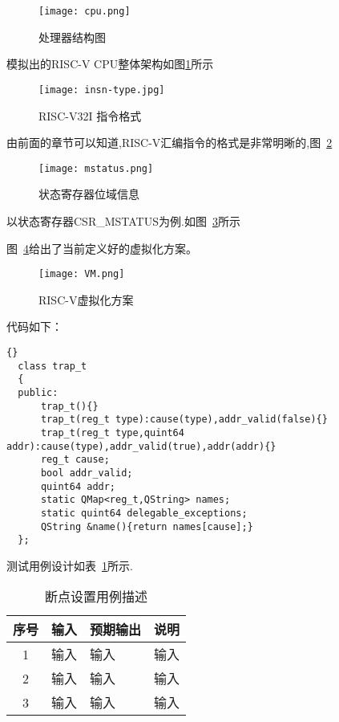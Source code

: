 \begin{figure}[h]
  \centering
  \texttt{[image: cpu.png]}
  \caption{处理器结构图}
  \label{fig:cpu}
\end{figure}
模拟出的RISC-V CPU整体架构如图\ref{fig:cpu}所示


\begin{figure}[h]
  \centering
  \texttt{[image: insn-type.jpg]}
  \caption{RISC-V32I 指令格式}
  \label{fig:insn-type}
\end{figure}
由前面的章节可以知道,RISC-V汇编指令的格式是非常明晰的,图~\ref{fig:insn-type}


\begin{figure}[h]
  \centering
  \texttt{[image: mstatus.png]}
  \caption{状态寄存器位域信息}
  \label{fig:mstatus}
\end{figure}
以状态寄存器CSR\_MSTATUS为例.如图~\ref{fig:mstatus}所示


图~\ref{fig:VM}给出了当前定义好的虚拟化方案。
\begin{figure}[h]
  \centering
  \texttt{[image: VM.png]}
  \caption{RISC-V虚拟化方案}
  \label{fig:VM}
\end{figure}

代码如下：
\begin{lstlisting}{}
  class trap_t
  {
  public:
      trap_t(){}
      trap_t(reg_t type):cause(type),addr_valid(false){}
      trap_t(reg_t type,quint64 addr):cause(type),addr_valid(true),addr(addr){}
      reg_t cause;
      bool addr_valid;
      quint64 addr;
      static QMap<reg_t,QString> names;
      static quint64 delegable_exceptions;
      QString &name(){return names[cause];}
  };        
\end{lstlisting}


测试用例设计如表~\ref{tab:demo}所示.
\begin{table}[h]
    \centering
    \caption{断点设置用例描述}
    \label{tab:demo}
    \begin{tabular}{clll}
      \toprule
      \multicolumn{1}{c}{序号} & \multicolumn{1}{c}{输入} & \multicolumn{1}{c}{预期输出} &\multicolumn{1}{c}{说明}\\
      \midrule
  1	& \multicolumn{1}{m{3.5cm}}{输入} & \multicolumn{1}{m{3.5cm}}{输入} & \multicolumn{1}{m{3.5cm}}{输入}\\
  \hline
  2	& \multicolumn{1}{m{3.5cm}}{输入} & \multicolumn{1}{m{3.5cm}}{输入} & \multicolumn{1}{m{3.5cm}}{输入}\\
  \hline
  3	& \multicolumn{1}{m{3.5cm}}{输入} & \multicolumn{1}{m{3.5cm}}{输入} & \multicolumn{1}{m{3.5cm}}{输入}\\
      \bottomrule
    \end{tabular}
\end{table}